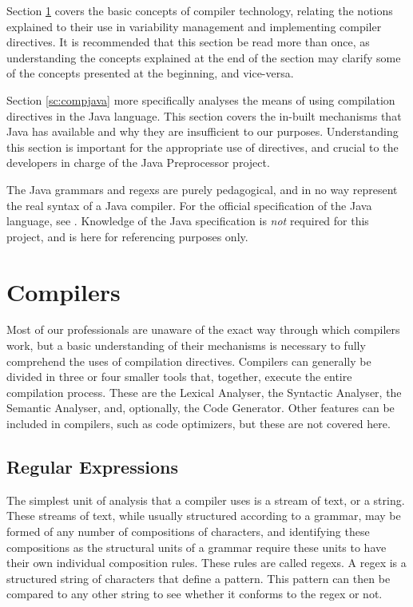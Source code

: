 Section \ref{sc:comp} covers the basic concepts of compiler technology, relating the notions explained to their use in variability management and implementing compiler directives. It is recommended that this section be read more than once, as understanding the concepts explained at the end of the section may clarify some of the concepts presented at the beginning, and vice-versa.

Section \ref{sc:compjava} more specifically analyses the means of using compilation directives in the Java language. This section covers the in-built mechanisms that Java has available and why they are insufficient to our purposes. Understanding this section is important for the appropriate use of directives, and crucial to the developers in charge of the Java Preprocessor project.

The Java \gls{grammar}s and \gls{regex}s are purely pedagogical, and in no way represent the real syntax of a Java compiler. For the official specification of the Java language, see \cite{GOSLING:2014}. Knowledge of the Java specification is \emph{not} required for this project, and is here for referencing purposes only.


\section{Compilers}
\label{sc:comp}

Most of our professionals are unaware of the exact way through which compilers work, but a basic understanding of their mechanisms is necessary to fully comprehend the uses of compilation directives. Compilers can generally be divided in three or four smaller tools that, together, execute the entire compilation process. These are the Lexical Analyser, the Syntactic Analyser, the Semantic Analyser, and, optionally, the Code Generator. Other features can be included in compilers, such as code optimizers, but these are not covered here.


\subsection{Regular Expressions}

The simplest unit of analysis that a compiler uses is a stream of text, or a string. These streams of text, while usually structured according to a \gls{grammar}, may be formed of any number of compositions of characters, and identifying these compositions as the structural units of a \gls{grammar} require these units to have their own individual composition rules. These rules are called \gls{regex}s. A \gls{regex} is a structured string of characters that define a pattern. This pattern can then be compared to any other string to see whether it conforms to the \gls{regex} or not.

